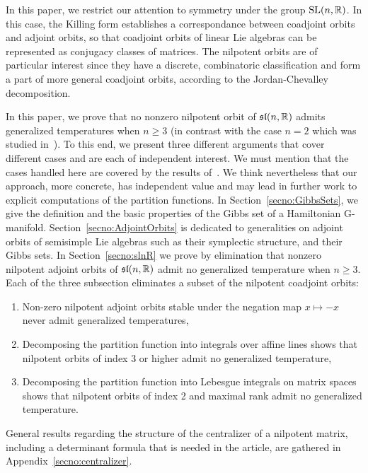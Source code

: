 \documentclass[english]{article}
\begin{document}
In this paper, we restrict our attention to symmetry under the group $\operatorname{SL}(n, \mathbb{R})$.
In this case, the Killing form establishes a correspondance between coadjoint orbits and adjoint orbits, so that coadjoint orbits of linear Lie algebras can be represented as conjugacy classes of matrices.
The nilpotent orbits are of particular interest since they have a discrete, combinatoric classification and form a part of more general coadjoint orbits, according to the Jordan-Chevalley decomposition.

In this paper, we prove that no nonzero nilpotent orbit of $\mathfrak{sl}(n, \mathbb{R})$ admits generalized temperatures when $n\geqslant 3$ (in contrast with the case $n=2$ which was studied in~\cite{NilpotentOrbitsGSI23}). To this end, we present three different arguments that cover different cases and are each of independent interest. We must mention that the cases handled here are covered by the results of~\cite{NeebGibbsEnsembles}. We think nevertheless that our approach, more concrete, has independent value and may lead in further work to explicit computations of the partition functions.
In Section~\ref{secno:GibbsSets}, we give the definition and the basic properties of the Gibbs set of a Hamiltonian G-manifold.
Section~\ref{secno:AdjointOrbits} is dedicated to generalities on adjoint orbits of semisimple Lie algebras such as their symplectic structure, and their Gibbs sets.
In Section~\ref{secno:slnR} we prove by elimination that nonzero nilpotent adjoint orbits of $\mathfrak{sl}(n, \mathbb{R})$ admit no generalized temperature when $n\geqslant 3$. Each of the three subsection eliminates a subset of the nilpotent coadjoint orbits:
\begin{enumerate}[label = Section 4.\arabic*:, align=left]%
	\item Non-zero nilpotent adjoint orbits stable under the negation map $x\mapsto -x$ never admit generalized temperatures,
	\item Decomposing the partition function into integrals over affine lines shows that nilpotent orbits of index $3$ or higher admit no generalized temperature,
	\item Decomposing the partition function into Lebesgue integrals on matrix spaces shows that nilpotent orbits of index 2 and maximal rank admit no generalized temperature.
\end{enumerate}
General results regarding the structure of the centralizer of a nilpotent matrix, including a determinant formula that is needed in the article, are gathered in Appendix~\ref{secno:centralizer}.
\end{document}

